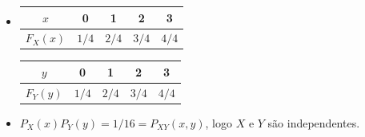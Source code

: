 \begin{respostas}
\begin{itemize}
    \item [d)] 
    \begin{minipage}{0.48\linewidth}
        \centering
        \begin{tabular}{c cccc}
        \toprule
            $x$ & 0 & 1 & 2 & 3 \\
        \midrule
            $F_X(x)$ & $1/4$ & $2/4$ & $3/4$ & $4/4$ \\
        \bottomrule
        \end{tabular}
    \end{minipage}
    \begin{minipage}{0.48\linewidth}
        \centering
        \begin{tabular}{c cccc}
        \toprule
            $y$ & 0 & 1 & 2 & 3 \\
        \midrule
            $F_Y(y)$ & $1/4$ & $2/4$ & $3/4$ & $4/4$ \\
        \bottomrule
        \end{tabular}
    \end{minipage}
    
    \item [e)] 
    $P_X(x)P_Y(y) = 1/16 = P_{XY}(x,y)$, logo $X$ e $Y$ são independentes.
\end{itemize}
\end{respostas}